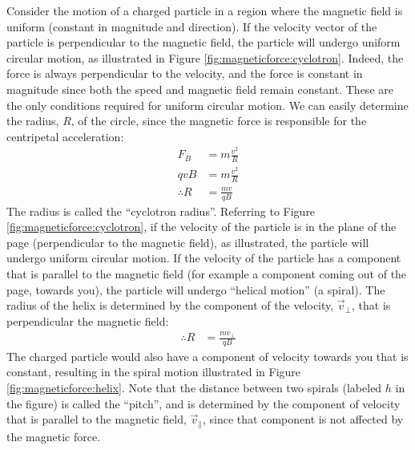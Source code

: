 Consider the motion of a charged particle in a region where the magnetic field is uniform (constant in magnitude and direction). If the velocity vector of the particle is perpendicular to the magnetic field, the particle will undergo uniform circular motion, as illustrated in Figure \ref{fig:magneticforce:cyclotron}. 
Indeed, the force is always perpendicular to the velocity, and the force is constant in magnitude since both the speed and magnetic field remain constant. These are the only conditions required for uniform circular motion. We can easily determine the radius, $R$, of the circle, since the magnetic force is responsible for the centripetal acceleration:
\begin{align*}
F_B &= m\frac{v^2}{R}\\
qvB &= m\frac{v^2}{R}\\
\therefore R &= \frac{mv}{qB}
\end{align*}
The radius is called the ``cyclotron radius''. 
Referring to Figure \ref{fig:magneticforce:cyclotron}, if the velocity of the particle is in the plane of the page (perpendicular to the magnetic field), as illustrated, the particle will undergo uniform circular motion. If the velocity of the particle has a component that is parallel to the magnetic field (for example a component coming out of the page, towards you), the particle will undergo ``helical motion'' (a spiral). The radius of the helix is determined by the component of the velocity, $\vec v_{\perp}$, that is perpendicular the magnetic field:
\begin{align*}
\therefore R &= \frac{mv_{\perp}}{qB}
\end{align*}
The charged particle would also have a component of velocity towards you that is constant, resulting in the spiral motion illustrated in Figure \ref{fig:magneticforce:helix}. Note that the distance between two spirals (labeled $h$ in the figure) is called the ``pitch'', and is determined by the component of velocity that is parallel to the magnetic field, $\vec v_\parallel$, since that component is not affected by the magnetic force. 
